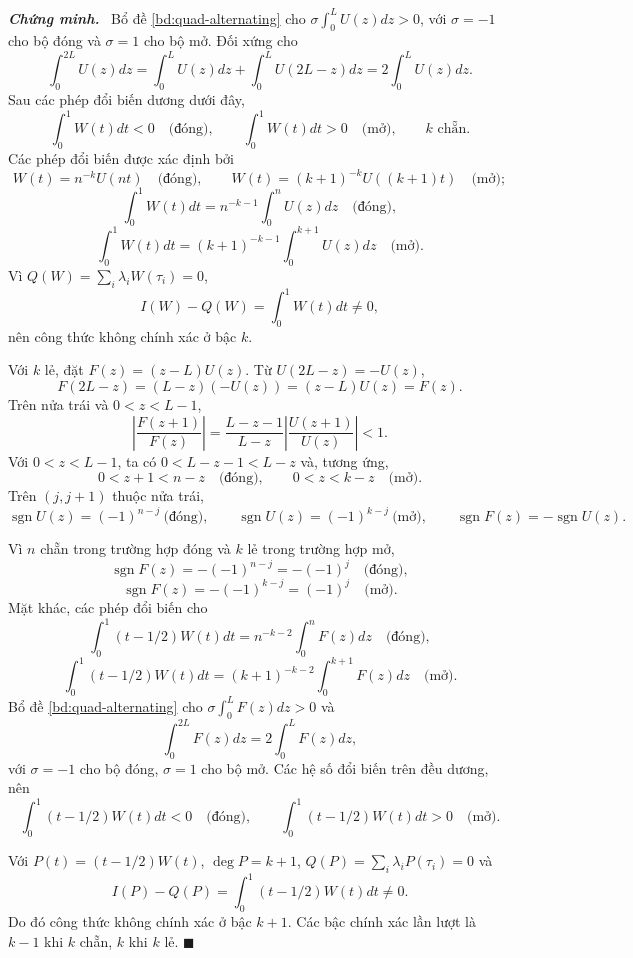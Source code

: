 \documentclass[12pt,a4paper,oneside]{book}
\numberwithin{algorithm}{chapter}
\theoremstyle{definition}
\newenvironment{chungminh}{\par\medskip\noindent\textbf{\textit{\color{mainblue}Chứng minh.}}\ }{\hfill$\blacksquare$\par\medskip}
\begin{document}
\begin{chungminh}
Bổ đề \ref{bd:quad-alternating} cho $\sigma\int_0^LU(z)dz>0$, với $\sigma=-1$ cho bộ đóng và $\sigma=1$ cho bộ mở. Đối xứng cho
\[
 \int_0^{2L}U(z)dz
 =\int_0^LU(z)dz+\int_0^LU(2L-z)dz
 =2\int_0^LU(z)dz.
\]
Sau các phép đổi biến dương dưới đây,
\[
 \int_0^1W(t)dt<0\quad\text{(đóng)},\qquad
 \int_0^1W(t)dt>0\quad\text{(mở)},\qquad k\text{ chẵn}.
\]
Các phép đổi biến được xác định bởi
\[
 W(t)=n^{-k}U(nt)\quad\text{(đóng)},\qquad
 W(t)=(k+1)^{-k}U((k+1)t)\quad\text{(mở)};
\]
\[
 \int_0^1W(t)dt=n^{-k-1}\int_0^nU(z)dz\quad\text{(đóng)},
\]
\[
 \int_0^1W(t)dt=(k+1)^{-k-1}\int_0^{k+1}U(z)dz\quad\text{(mở)}.
\] Vì $Q(W)=\sum_i\lambda_iW(\tau_i)=0$,
\[
 I(W)-Q(W)=\int_0^1W(t)dt\ne0,
\]
nên công thức không chính xác ở bậc $k$.


Với $k$ lẻ, đặt $F(z)=(z-L)U(z)$. Từ $U(2L-z)=-U(z)$,
\[
 F(2L-z)=(L-z)(-U(z))=(z-L)U(z)=F(z).
\] Trên nửa trái và $0<z<L-1$,
\[
 \left|\frac{F(z+1)}{F(z)}\right|
 =\frac{L-z-1}{L-z}\left|\frac{U(z+1)}{U(z)}\right|<1.
\]
Với $0<z<L-1$, ta có $0<L-z-1<L-z$ và, tương ứng,
\[
 0<z+1<n-z\quad\text{(đóng)},\qquad0<z<k-z\quad\text{(mở)}.
\]
Trên $(j,j+1)$ thuộc nửa trái,
\[
 \operatorname{sgn}U(z)=(-1)^{n-j}\ \text{(đóng)},\qquad
 \operatorname{sgn}U(z)=(-1)^{k-j}\ \text{(mở)},\qquad
 \operatorname{sgn}F(z)=-\operatorname{sgn}U(z).
\]

Vì $n$ chẵn trong trường hợp đóng và $k$ lẻ trong trường hợp mở,
\[
 \operatorname{sgn}F(z)=-(-1)^{n-j}=-(-1)^j\quad\text{(đóng)},
\]
\[
 \operatorname{sgn}F(z)=-(-1)^{k-j}=(-1)^j\quad\text{(mở)}.
\] Mặt khác, các phép đổi biến cho
\[
 \int_0^1(t-1/2)W(t)dt=n^{-k-2}\int_0^nF(z)dz\quad\text{(đóng)},
\]
\[
 \int_0^1(t-1/2)W(t)dt=(k+1)^{-k-2}\int_0^{k+1}F(z)dz\quad\text{(mở)}.
\]
Bổ đề \ref{bd:quad-alternating} cho $\sigma\int_0^LF(z)dz>0$ và
\[
 \int_0^{2L}F(z)dz=2\int_0^LF(z)dz,
\]
với $\sigma=-1$ cho bộ đóng, $\sigma=1$ cho bộ mở. Các hệ số đổi biến trên đều dương, nên
\[
 \int_0^1(t-1/2)W(t)dt<0\quad\text{(đóng)},\qquad
 \int_0^1(t-1/2)W(t)dt>0\quad\text{(mở)}.
\]

Với $P(t)=(t-1/2)W(t)$, $\deg P=k+1$, $Q(P)=\sum_i\lambda_iP(\tau_i)=0$ và
\[
 I(P)-Q(P)=\int_0^1(t-1/2)W(t)dt\ne0.
\]
Do đó công thức không chính xác ở bậc $k+1$. Các bậc chính xác lần lượt là $k-1$ khi $k$ chẵn, $k$ khi $k$ lẻ.
\end{chungminh}
\end{document}
